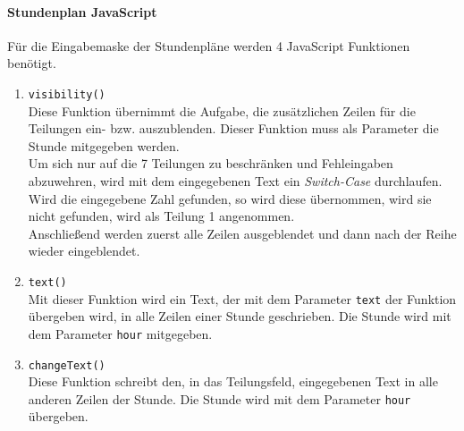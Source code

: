 \paragraph{Stundenplan JavaScript} $ ~~ $\\ \label{sec:content_imple_input_java_lessons}
Für die Eingabemaske der Stundenpläne werden 4 JavaScript Funktionen benötigt.
\begin{enumerate}
	\item \texttt{visibility()}\\
	Diese Funktion übernimmt die Aufgabe, die zusätzlichen Zeilen für die Teilungen ein- bzw. auszublenden. Dieser Funktion muss als Parameter die Stunde mitgegeben werden.\\
	Um sich nur auf die 7 Teilungen zu beschränken und Fehleingaben abzuwehren, wird mit dem eingegebenen Text ein \textit{Switch-Case} durchlaufen. Wird die eingegebene Zahl gefunden, so wird diese übernommen, wird sie nicht gefunden, wird als Teilung 1 angenommen.\\
	Anschließend werden zuerst alle Zeilen ausgeblendet und dann nach der Reihe wieder eingeblendet.
	
	
	
	\item \texttt{text()}\\
	Mit dieser Funktion wird ein Text, der mit dem Parameter \texttt{text} der Funktion übergeben wird, in alle Zeilen einer Stunde geschrieben. Die Stunde wird mit dem Parameter \texttt{hour} mitgegeben.
	
	

\newpage

	\item \texttt{changeText()}\\
	Diese Funktion schreibt den, in das Teilungsfeld, eingegebenen Text in alle anderen Zeilen der Stunde. Die Stunde wird mit dem Parameter \texttt{hour} übergeben.
	
	
	

\end{enumerate}
